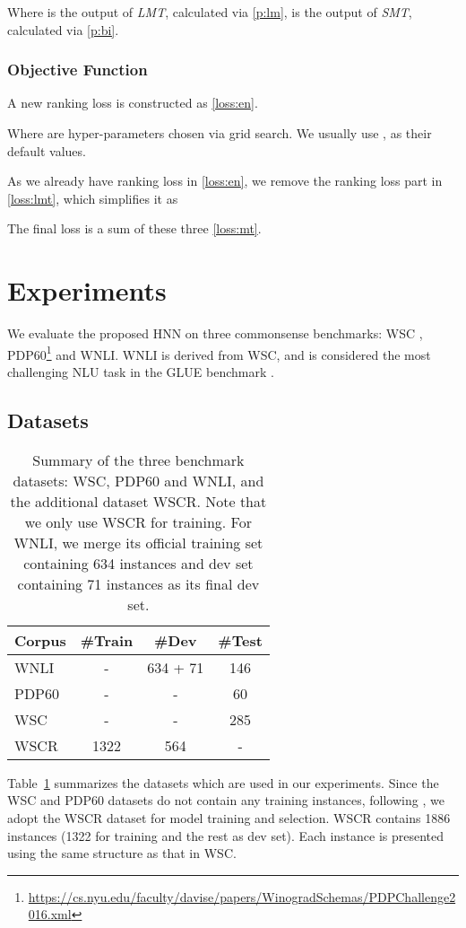 \documentclass[11pt,a4paper]{article}
\newcommand{\lmt}{\textit{LMT}}
\newcommand{\smt}{\textit{SMT}}
\newcommand{\nmodel}{HNN}
\newcommand{\wsc}{WSC}
\begin{document}
Where  is the output of \lmt, calculated via \eqref{p:lm},  is the output of \smt, calculated via \eqref{p:bi}.

\subsubsection{Objective Function}
A new ranking loss  is constructed as \eqref{loss:en}.

Where  are hyper-parameters chosen via grid search. We usually use ,  as their default values.

As we already have ranking loss in \eqref{loss:en}, we remove the ranking loss part in \eqref{loss:lmt}, which simplifies it as 


The final loss  is a sum of these three \eqref{loss:mt}.




\fi 


\section{Experiments}
\label{sec:exp}
We evaluate the proposed {\nmodel} on three commonsense benchmarks: {\wsc} \cite{winograd2012}, PDP60\footnote{\url{https://cs.nyu.edu/faculty/davise/papers/WinogradSchemas/PDPChallenge2016.xml}} and WNLI. 
WNLI is derived from WSC, and is considered the most challenging NLU task in the GLUE benchmark \cite{wang2018glue}.



\subsection{Datasets}
\label{subsec:data}
\begin{table}[htb!]
	\begin{center}
		\begin{tabular}{l|c|c|c}
			\hline \bf Corpus & \#Train & \#Dev & \#Test\\ \hline \hline
            WNLI& - & 634 + 71& 146  \\ \hline
            PDP60 &-& -& 60  \\ \hline
            {\wsc} &-& -& 285  \\ \hline
            WSCR &1322&564 &-   \\ \hline
		\end{tabular}
	\end{center}
\caption{Summary of the three benchmark datasets: {\wsc}, PDP60 and WNLI, and the additional dataset WSCR. Note that we only use WSCR for training. For WNLI, we merge its official training set containing 634 instances and dev set containing 71 instances as its final dev set.
	}
	\label{tab:datasets}
\end{table}
Table~\ref{tab:datasets} summarizes the datasets which are used in our experiments. 
Since the {\wsc} and PDP60 datasets do not contain any training instances, following \cite{kocijan2019surprisingly}, we adopt the WSCR dataset \cite{rahman2012resolving} for model training and selection. 
WSCR contains 1886 instances (1322 for training and the rest as dev set). 
Each instance is presented using the same structure as that in WSC. 
\end{document}
